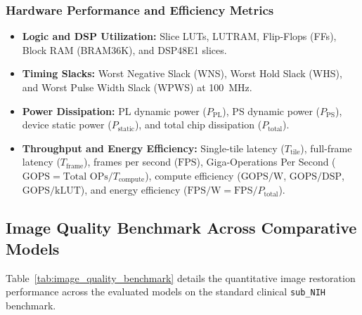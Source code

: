 \documentclass[conference]{IEEEtran}
\begin{document}
\subsubsection{Hardware Performance and Efficiency Metrics}
\begin{itemize}
    \item \textbf{Logic and DSP Utilization:} Slice LUTs, LUTRAM, Flip-Flops (FFs), Block RAM (BRAM36K), and DSP48E1 slices.
    \item \textbf{Timing Slacks:} Worst Negative Slack (WNS), Worst Hold Slack (WHS), and Worst Pulse Width Slack (WPWS) at 100~MHz.
    \item \textbf{Power Dissipation:} PL dynamic power ($P_{\text{PL}}$), PS dynamic power ($P_{\text{PS}}$), device static power ($P_{\text{static}}$), and total chip dissipation ($P_{\text{total}}$).
    \item \textbf{Throughput and Energy Efficiency:} Single-tile latency ($T_{\text{tile}}$), full-frame latency ($T_{\text{frame}}$), frames per second ($\text{FPS}$), Giga-Operations Per Second ($\text{GOPS} = \text{Total OPs} / T_{\text{compute}}$), compute efficiency ($\text{GOPS/W}$, $\text{GOPS/DSP}$, $\text{GOPS/kLUT}$), and energy efficiency ($\text{FPS/W} = \text{FPS} / P_{\text{total}}$).
\end{itemize}

\subsection{Image Quality Benchmark Across Comparative Models}
\label{sec:quality_benchmark}

Table~\ref{tab:image_quality_benchmark} details the quantitative image restoration performance across the evaluated models on the standard clinical \texttt{sub\_NIH} benchmark.
\end{document}

